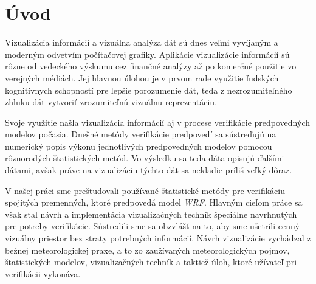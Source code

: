 \chapter{Úvod}
	
	
Vizualizácia informácií a vizuálna analýza dát sú dnes veľmi vyvíjaným a moderným odvetvím počítačovej grafiky. Aplikácie vizualizácie informácií sú rôzne od vedeckého výskumu cez finančné analýzy až po komerčné použitie vo verejných médiách. Jej hlavnou úlohou je v prvom rade využitie ľudských kognitívnych schopností pre lepšie porozumenie dát, teda z nezrozumiteľného zhluku dát vytvoriť zrozumiteľnú vizuálnu reprezentáciu.

Svoje využitie našla vizualizácia informácií aj v procese verifikácie predpovedných modelov počasia. Dnešné metódy verifikácie predpovedí sa sústreďujú na numerický popis výkonu jednotlivých predpovedných modelov pomocou rôznorodých štatistických metód. Vo výsledku sa teda dáta opisujú ďalšími dátami, avšak práve na vizualizáciu týchto dát sa nekladie príliš veľký dôraz.

V našej práci sme preštudovali používané štatistické metódy pre verifikáciu spojitých premenných, ktoré predpovedá model \textit{WRF}. Hlavným cieľom práce sa však stal návrh a implementácia vizualizačných techník špeciálne navrhnutých pre potreby verifikácie. Sústredili sme sa obzvlášť na to, aby sme ušetrili cenný vizuálny priestor bez straty potrebných informácií. Návrh vizualizácie vychádzal z bežnej meteorologickej praxe, a to zo zaužívaných meteorologických pojmov, štatistických modelov, vizualizačných techník a taktiež úloh, ktoré užívateľ pri verifikácii vykonáva.
